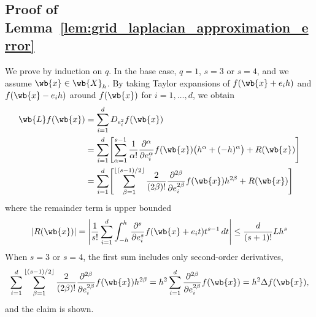 \documentclass{article}
\newcommand{\abs}[1]{\left \lvert #1 \right \rvert}
\newcommand{\floor}[1]{\left\lfloor #1 \right\rfloor}
\newcommand{\1}{\mathbf{1}}
\theoremstyle{alden}
\theoremstyle{aldenthm}
\theoremstyle{definition}
\theoremstyle{remark}
\begin{document}
\subsection{Proof of Lemma~\ref{lem:grid_laplacian_approximation_error}}
\label{subsec:grid_laplacian_approximation_error_pf}
We prove by induction on $q$. In the base case, $q = 1$, $s = 3$ or $s = 4$, and we assume $\wb{x} \in \wb{X}_{h}$. By taking Taylor expansions of $f(\wb{x} + e_ih)$ and $f(\wb{x} - e_ih)$ around $f(\wb{x})$ for $i = 1,\ldots,d$, we obtain
\begin{align}
\wb{L}f(\wb{x}) & = \sum_{i = 1}^{d} D_{e_i^2}f(\wb{x}) \nonumber \\
& = \sum_{i = 1}^{d} \Biggl[\sum_{\alpha = 1}^{s - 1}\frac{1}{\alpha!}\frac{\partial^{\alpha}}{\partial e_i^{\alpha}} f(\wb{x})\bigl(h^{\alpha} + (-h)^{\alpha}\bigr) + R(\wb{x}) \Biggr] \nonumber \\
& = \sum_{i = 1}^{d} \Biggl[\sum_{\beta = 1}^{\floor{(s - 1)/2}}\frac{2}{(2\beta)!}\frac{\partial^{2\beta}}{\partial e_i^{2\beta}} f(\wb{x}) h^{2\beta} + R(\wb{x})\Biggr] \label{eqn:grid_laplacian_approximation_error_pf1}
\end{align} 
where the remainder term is upper bounded
\begin{equation*}
\abs{R(\wb{x})} = \abs{\frac{1}{s!}\sum_{i = 1}^d \int_{-h}^{h} \frac{\partial^s}{\partial e_i^s} f(\wb{x} + e_it) t^{s - 1} \,dt} \leq \frac{d}{(s + 1)!} L h^s 
\end{equation*}
When $s = 3$ or $s = 4$, the first sum includes only second-order derivatives,
\begin{equation*}
\sum_{i = 1}^{d} \sum_{\beta = 1}^{\floor{(s - 1)/2}}\frac{2}{(2\beta)!}\frac{\partial^{2\beta}}{\partial e_i^{2\beta}} f(\wb{x}) h^{2\beta} = h^2 \sum_{i = 1}^d \frac{\partial^{2\beta}}{\partial e_i^{2\beta}} f(\wb{x}) = h^2 \Delta f(\wb{x}),
\end{equation*}
and the claim is shown.
\end{document}
